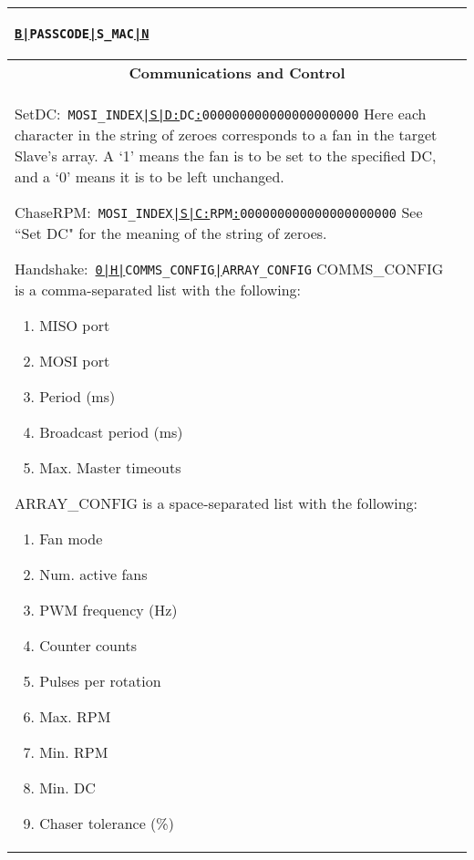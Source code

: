 \documentclass{article}
\begin{document}
\begin{center}
\begin{longtable}{| p{} | p{} |}
\begin{itemize}
		\linebreak\texttt{\underline{B|}PASSCODE\underline{|}S\_MAC\underline{|N}}
	\end{itemize}
	\\
	\hline
	\multicolumn{2}{|c|}{\textbf{Communications and Control}}\\*
	\hline
	\begin{itemize}
	{\scriptsize
		\item {Set\hspace{.5em}DC:}\
		\linebreak\texttt{MOSI\_INDEX\underline{|S|D:}DC\underline{:}000000000000000000000}
		\linebreak Here each character in the string of zeroes corresponds to a fan in the
		target Slave's array. A `1' means the fan is to be set to the specified DC, and 
		a `0' means it is to be left unchanged.
		\item {Chase\hspace{.5em}RPM:}\
		\linebreak\texttt{MOSI\_INDEX\underline{|S|C:}RPM\underline{:}000000000000000000000}
		\linebreak See ``Set DC" for the meaning of the string of zeroes.
		\item {Handshake:}\
		\linebreak\texttt{\underline{0|H|}COMMS\_CONFIG\underline{|}ARRAY\_CONFIG}
		\linebreak COMMS\_CONFIG is a comma-separated list with the following:
		\begin{enumerate}
			\item MISO port
			\item MOSI port
			\item Period (ms)
			\item Broadcast period (ms)
			\item Max. Master timeouts
		\end{enumerate}
		ARRAY\_CONFIG is a space-separated list with the following:
		\begin{enumerate}
			\item Fan mode
			\item Num. active fans
			\item PWM frequency (Hz)
			\item Counter counts
			\item Pulses per rotation 
			\item Max. RPM
			\item Min. RPM
			\item Min. DC
			\item Chaser tolerance (\%)

\end{enumerate}}
\end{itemize}
\end{longtable}
\end{center}
\end{document}

